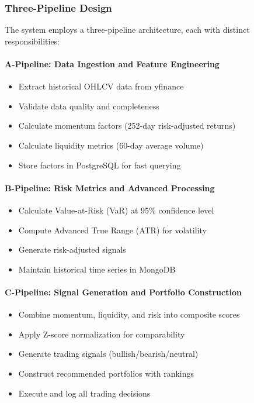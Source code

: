 \documentclass[11pt, a4paper, twoside]{article}
\begin{document}
\subsubsection{Three-Pipeline Design}

The system employs a three-pipeline architecture, each with distinct responsibilities:

\paragraph{\textbf{A-Pipeline: Data Ingestion and Feature Engineering}}

\begin{itemize}
    \item Extract historical OHLCV data from yfinance
    \item Validate data quality and completeness
    \item Calculate momentum factors (252-day risk-adjusted returns)
    \item Calculate liquidity metrics (60-day average volume)
    \item Store factors in PostgreSQL for fast querying
\end{itemize}

\paragraph{\textbf{B-Pipeline: Risk Metrics and Advanced Processing}}

\begin{itemize}
    \item Calculate Value-at-Risk (VaR) at 95\% confidence level
    \item Compute Advanced True Range (ATR) for volatility
    \item Generate risk-adjusted signals
    \item Maintain historical time series in MongoDB
\end{itemize}

\paragraph{\textbf{C-Pipeline: Signal Generation and Portfolio Construction}}

\begin{itemize}
    \item Combine momentum, liquidity, and risk into composite scores
    \item Apply Z-score normalization for comparability
    \item Generate trading signals (bullish/bearish/neutral)
    \item Construct recommended portfolios with rankings
    \item Execute and log all trading decisions
\end{itemize}
\end{document}
